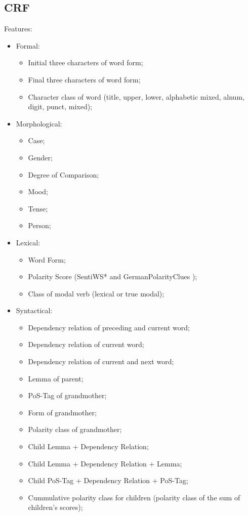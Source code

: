 \documentclass{beamer}
\begin{document}
\subsection{CRF}
\begin{frame}{}
  Features:
  \begin{multicols}{2}
    \begin{itemize}
    \item Formal:
      \begin{itemize}
        \tiny
      \item Initial three characters of word form;
      \item Final three characters of word form;
      \item Character class of word (title, upper, lower,
        alphabetic mixed, alnum, digit, punct, mixed);
      \end{itemize}
    \item Morphological:
      \begin{itemize}
        \tiny
      \item Case;
      \item Gender;
      \item Degree of Comparison;
      \item Mood;
      \item Tense;
      \item Person;
      \end{itemize}
    \item Lexical:
      \begin{itemize}
        \tiny
      \item Word Form;
      \item Polarity Score (SentiWS* \cite{Remus-10} and
        GermanPolarityClues \cite{Waltinger-10});
      \item Class of modal verb (lexical or true modal);
      \end{itemize}
    \item Syntactical:
      \begin{itemize}
        \tiny
      \item Dependency relation of preceding and current word;
      \item Dependency relation of current word;
      \item Dependency relation of current and next word;
      \item Lemma of parent;
      \item PoS-Tag of grandmother;
      \item Form of grandmother;
      \item Polarity class of grandmother;
      \item Child Lemma + Dependency Relation;
      \item Child Lemma + Dependency Relation + Lemma;
      \item Child PoS-Tag + Dependency Relation + PoS-Tag;
      \item Cummulative polarity class for children (polarity
        class of the sum of children's scores);
      \end{itemize}
    \end{itemize}
  \end{multicols}
\end{frame}
\end{document}
